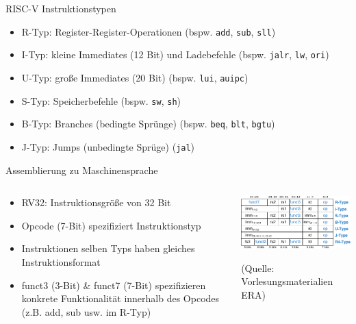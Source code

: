 \documentclass[
  german,            %
  aspectratio=169,    %
]{tumbeamer}
\begin{document}
\begin{frame}[c, fragile]{RISC-V Instruktionstypen}{}
	\begin{itemize}
		\item R-Typ: Register-Register-Operationen (bspw. \texttt{add}, \texttt{sub}, \texttt{sll})
		\item I-Typ: kleine Immediates (12 Bit) und Ladebefehle (bspw. \texttt{jalr}, \texttt{lw}, \texttt{ori})
		\item U-Typ: große Immediates (20 Bit) (bspw. \texttt{lui}, \texttt{auipc})
		\item S-Typ: Speicherbefehle (bspw. \texttt{sw}, \texttt{sh})
		\item B-Typ: Branches (bedingte Sprünge) (bspw. \texttt{beq}, \texttt{blt}, \texttt{bgtu})
		\item J-Typ: Jumps (unbedingte Sprüge) (\texttt{jal})
	\end{itemize}
\end{frame}

\begin{frame}[c, fragile]{Assemblierung zu Maschinensprache}{}
	\begin{columns}[c]
		\begin{column}{0.5\textwidth}
			\begin{itemize}
				\item RV32: Instruktionsgröße von 32 Bit
				\item Opcode (7-Bit) spezifiziert Instruktionstyp
				\item Instruktionen selben Typs haben gleiches Instruktionsformat
				\item funct3 (3-Bit) \& funct7 (7-Bit) spezifizieren konkrete Funktionalität innerhalb des Opcodes (z.B. add, sub usw. im R-Typ)
			\end{itemize}
		\end{column}
		\begin{column}{0.5\textwidth}
			\begin{center}
				\includegraphics[width=\textwidth]{w08_risc_v_types.pdf}\\
			\end{center}
			\centering
			\tiny (Quelle: Vorlesungsmaterialien ERA)
		\end{column}
	\end{columns}
\end{frame}
\end{document}
